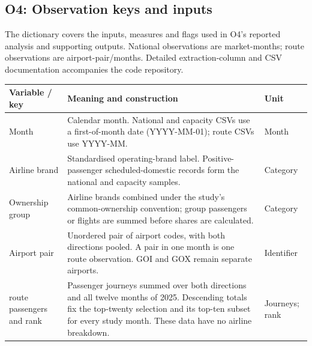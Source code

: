 \clearpage

\subsection{O4: Observation keys and inputs}
\label{app:o4-input-definitions}
The dictionary covers the inputs, measures and flags used in O4's reported analysis and supporting outputs. National observations are market-months; route observations are airport-pair/months. Detailed extraction-column and CSV documentation accompanies the code repository.

\begin{minipage}{\linewidth}
\captionsetup{font=small,labelfont=bf,justification=raggedright,singlelinecheck=false,hypcap=false}
\label{tab:o4-dictionary-inputs}
\centering
{\footnotesize{}\setlength{\tabcolsep}{4pt}\fontsize{10}{12}\selectfont{}\setlength{\tabcolsep}{3pt}
\renewcommand{\arraystretch}{1.15}
\begin{tabular}{|>{\raggedright\arraybackslash}p{}|>{\raggedright\arraybackslash}p{}|>{\raggedright\arraybackslash}p{}|}
\hline
\textbf{Variable / key} & \textbf{Meaning and construction} & \textbf{Unit} \\
\hline
Month & Calendar month. National and capacity CSVs use a first-of-month date (YYYY-MM-01); route CSVs use YYYY-MM. & Month \\
\hline
Airline brand & Standardised operating-brand label. Positive-passenger scheduled-domestic records form the national and capacity samples. & Category \\
\hline
Ownership group & Airline brands combined under the study's common-ownership convention; group passengers or flights are summed before shares are calculated. & Category \\
\hline
Airport pair & Unordered pair of airport codes, with both directions pooled. A pair in one month is one route observation. GOI and GOX remain separate airports. & Identifier \\
\hline
2025 route passengers and rank & Passenger journeys summed over both directions and all twelve months of 2025. Descending totals fix the top-twenty selection and its top-ten subset for every study month. These data have no airline breakdown. & Journeys; rank \\

\end{tabular}}
\end{minipage}
